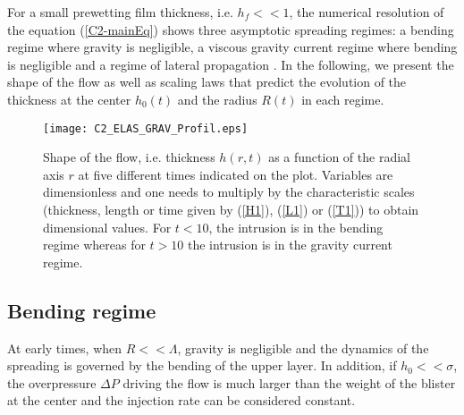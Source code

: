 For a small  prewetting film thickness, i.e.   $h_f<<1$, the numerical
resolution of  the equation  (\ref{C2-mainEq}) shows  three asymptotic
spreading regimes:  a bending  regime where  gravity is  negligible, a
viscous  gravity current  regime  where bending  is  negligible and  a
regime               of              lateral               propagation
\citep{Michaut:2011kg,Bunger:2011cb,Lister:2013ia}. In  the following,
we present the shape of the flow  as well as scaling laws that predict
the evolution of  the thickness at the center $h_0(t)$  and the radius
$R(t)$ in each regime.

\begin{figure}[h!]
  \begin{center}
    \graphicspath{ {/Users/thorey/Documents/These/Manuscript/Figure/Chapter2/} }
    \texttt{[image: C2\_ELAS\_GRAV\_Profil.eps]}
    \caption{Shape of the flow, i.e.  thickness $h(r,t)$ as a function
      of the radial axis $r$ at  five different times indicated on the
      plot. Variables are  dimensionless and one needs  to multiply by
      the characteristic  scales (thickness,  length or time  given by
      (\ref{H1}),  (\ref{L1})  or  (\ref{T1})) to  obtain  dimensional
      values.   For $t<10$,  the intrusion  is in  the bending  regime
      whereas  for $t>10$  the  intrusion is  in  the gravity  current
      regime.}
    \label{C2_ELAS_GRAV_Profil}
  \end{center}
\end{figure}

\subsection{Bending regime}
\label{C2-sec:bending-regime}

At  early times,  when  $R<<\Lambda$, gravity  is  negligible and  the
dynamics of  the spreading  is governed  by the  bending of  the upper
layer.   In addition,  if $h_0<<\sigma$,  the overpressure  $\Delta P$
driving the flow is much larger than  the weight of the blister at the
center and the injection rate can be considered constant.

